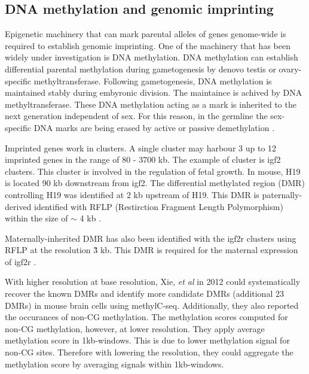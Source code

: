 \documentclass[review,12pt]{elsarticle}
\begin{document}
\subsection{DNA methylation and genomic imprinting}

    Epigenetic machinery that can mark parental alleles of genes genome-wide is required to establish genomic imprinting.
One of the machinery that has been widely under investigation is DNA methylation.
DNA methylation can establish differential parental methylation during gametogenesis by denovo testis or ovary-specific methyltransferase.
Following gametogenesis, DNA methylation is maintained stably during embyronic division. 
The maintaince is achived by DNA methyltransferase.
These DNA methylation acting as a mark is inherited to the next generation independent of sex.
For this reason, in the germline the sex-specific DNA marks are being erased by active or passive demethylation \cite{barlow2014genomic}.


    Imprinted genes work in clusters. 
A single cluster may harbour 3 up to 12 imprinted genes in the range of 80 - 3700 kb.
The example of cluster is igf2 clusters. 
This cluster is involved in the regulation of fetal growth.
In mouse, H19 is located 90 kb downstream from igf2.
The differential methylated region (DMR) controlling H19 was identified at 2 kb upstream of H19.
This DMR is paternally-derived identified with RFLP (Restirction Fragment Length Polymorphism) within the size of $\sim$ 4 kb \cite{bartolomei1993epigenetic}.

    Maternally-inherited DMR has also been identified with the igf2r clusters using RFLP at the resolution \~ 3 kb.
    This DMR is required for the maternal expression of igf2r \cite{stoger1993maternal}.   

    With higher resolution at base resolution, Xie, \textit{et al} in 2012 could systematically recover the known DMRs and identify more candidate DMRs  (additional 23 DMRs) in mouse brain cells using methylC-seq.
Additionally, they also reported the occurances of non-CG methylation.
The methylation scores computed for non-CG methylation, however, at lower resolution.
They apply average methylation score in 1kb-windows.
This is due to lower methylation signal for non-CG sites.
Therefore with lowering the resolution, they could aggregate the methylation score by averaging signals within 1kb-windows. \cite{xie2012base}


\label{}

\end{document}
